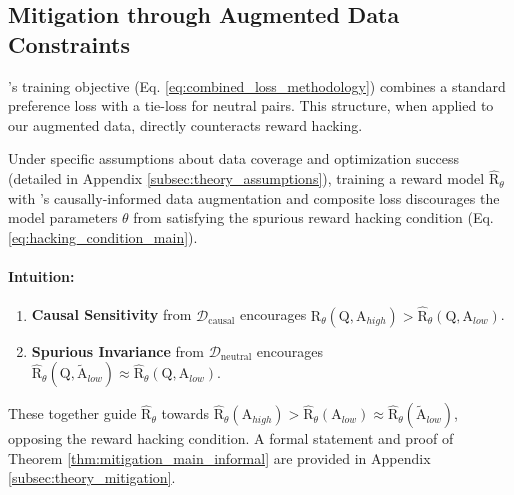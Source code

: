 \vspace{-0.2in}
\subsection{Mitigation through Augmented Data Constraints}
\carma{}'s training objective (Eq. \ref{eq:combined_loss_methodology}) combines a standard preference loss with a tie-loss for neutral pairs. This structure, when applied to our augmented data, directly counteracts reward hacking.

\begin{theorem}
\label{thm:mitigation_main_informal}
Under specific assumptions about data coverage and optimization success (detailed in Appendix \ref{subsec:theory_assumptions}), training a reward model $\hat{\mathrm{R}}_\theta$ with \carma{}'s causally-informed data augmentation and composite loss discourages the model parameters $\theta$ from satisfying the spurious reward hacking condition (Eq. \ref{eq:hacking_condition_main}).
\end{theorem}

\vspace{-0.1in}
\paragraph{Intuition:}

\vspace{-0.05in}
\begin{enumerate}[itemsep=0pt, left=10pt, topsep=3pt]
    \item \textbf{Causal Sensitivity} from $\mathcal{D}_{\mathrm{causal}}$ encourages $\hat{\mathrm{R}}_\theta(\mathrm{Q}, \mathrm{A}_{high}) > \hat{\mathrm{R}}_\theta(\mathrm{Q}, \mathrm{A}_{low})$.
    \item \textbf{Spurious Invariance} from $\mathcal{D}_{\mathrm{neutral}}$ encourages $\hat{\mathrm{R}}_\theta(\mathrm{Q}, \tilde{\mathrm{A}}_{low}) \approx \hat{\mathrm{R}}_\theta(\mathrm{Q}, \mathrm{A}_{low})$.
\end{enumerate}
These together guide $\hat{\mathrm{R}}_\theta$ towards $\hat{\mathrm{R}}_\theta(\mathrm{A}_{high}) > \hat{\mathrm{R}}_\theta(\mathrm{A}_{low}) \approx \hat{\mathrm{R}}_\theta(\tilde{\mathrm{A}}_{low})$, opposing the reward hacking condition. A formal statement and proof of Theorem \ref{thm:mitigation_main_informal} are provided in Appendix \ref{subsec:theory_mitigation}.


